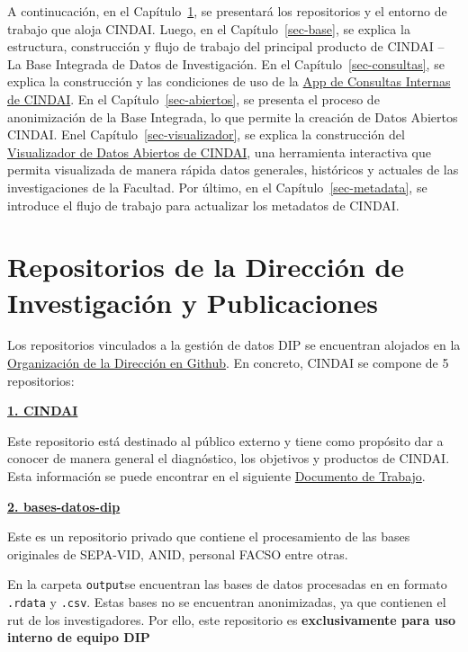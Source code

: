 \documentclass[
  spanish,
  letterpaper,
  DIV=11,
  numbers=noendperiod]{scrreprt}
\begin{document}
A continucación, en el Capítulo~\ref{sec-repo}, se presentará los
repositorios y el entorno de trabajo que aloja CINDAI. Luego, en el
Capítulo~\ref{sec-base}, se explica la estructura, construcción y flujo
de trabajo del principal producto de CINDAI -- La Base Integrada de
Datos de Investigación. En el Capítulo~\ref{sec-consultas}, se explica
la construcción y las condiciones de uso de la
\href{https://dip-facso.shinyapps.io/consultas/}{App de Consultas
Internas de CINDAI}. En el Capítulo~\ref{sec-abiertos}, se presenta el
proceso de anonimización de la Base Integrada, lo que permite la
creación de Datos Abiertos CINDAI. Enel Capítulo~\ref{sec-visualizador},
se explica la construcción del
\href{https://dip-facso.shinyapps.io/datos-abiertos-CINDAI/\#inicio}{Visualizador
de Datos Abiertos de CINDAI}, una herramienta interactiva que permita
visualizada de manera rápida datos generales, históricos y actuales de
las investigaciones de la Facultad. Por último, en el
Capítulo~\ref{sec-metadata}, se introduce el flujo de trabajo para
actualizar los metadatos de CINDAI.


\chapter{Repositorios de la Dirección de Investigación y
Publicaciones}\label{sec-repo}

Los repositorios vinculados a la gestión de datos DIP se encuentran
alojados en la
\href{https://github.com/facso-investigacion}{Organización de la
Dirección en Github}. En concreto, CINDAI se compone de 5 repositorios:

\href{https://github.com/facso-investigacion/CINDAI}{\textbf{1. CINDAI}}

Este repositorio está destinado al público externo y tiene como
propósito dar a conocer de manera general el diagnóstico, los objetivos
y productos de CINDAI. Esta información se puede encontrar en el
siguiente
\href{https://facso-investigacion.github.io/CINDAI/index.html}{Documento
de Trabajo}.

\href{https://github.com/facso-investigacion/bases-datos-dip}{\textbf{2.
bases-datos-dip}}

Este es un repositorio privado que contiene el procesamiento de las
bases originales de SEPA-VID, ANID, personal FACSO entre otras.

En la carpeta \texttt{output}se encuentran las bases de datos procesadas
en en formato \texttt{.rdata} y \texttt{.csv}. Estas bases no se
encuentran anonimizadas, ya que contienen el rut de los investigadores.
Por ello, este repositorio es \textbf{exclusivamente para uso interno de
equipo DIP}
\end{document}
